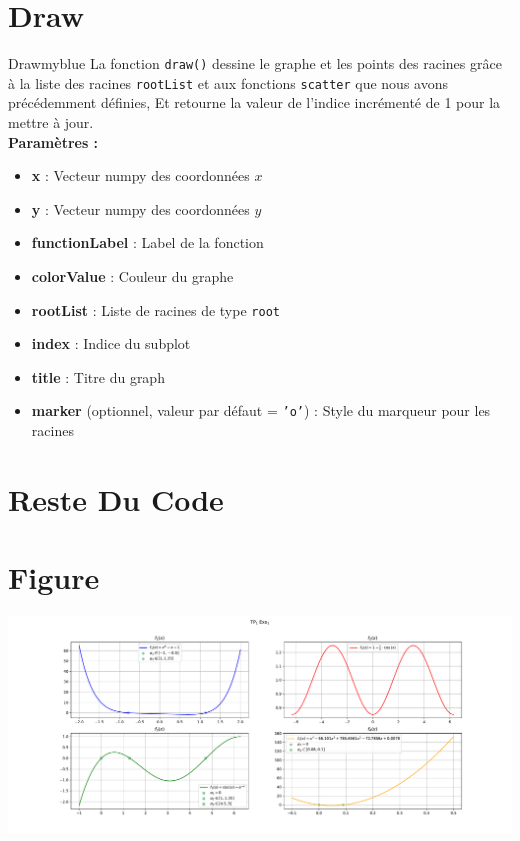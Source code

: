 \section{Draw}
\begin{prettyBox}{Draw}{myblue}
La fonction \texttt{draw()} dessine le graphe et les points des racines
grâce à la liste des racines \texttt{rootList} et aux fonctions \texttt{scatter} que nous avons précédemment définies, Et retourne la valeur de l’indice incrémenté de 1 pour la mettre à jour.\\[0.1cm]
\textbf{Paramètres :}  
\begin{itemize}
    \item \textbf{x} : Vecteur numpy des coordonnées \( x \)
    \item \textbf{y} : Vecteur numpy des coordonnées \( y \)
    \item \textbf{functionLabel} : Label de la fonction
    \item \textbf{colorValue} : Couleur du graphe
    \item \textbf{rootList} : Liste de racines de type \texttt{root}
    \item \textbf{index} : Indice du subplot
    \item \textbf{title} : Titre du graph
    \item \textbf{marker} (optionnel, valeur par défaut = \texttt{'o'}) : Style du marqueur pour les racines
\end{itemize}
\end{prettyBox}
\vspace{0.5cm}


\vspace{1cm}
\section{Reste Du Code}


\newpage
\section{Figure}
\begin{center}
    \includegraphics[height=0.35\textheight]{Exercices/EX1/fig.pdf}
\end{center}


